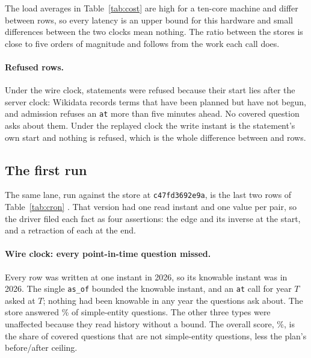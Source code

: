 The load averages in Table~\ref{tab:cost} are high for a ten-core machine and
differ between rows, so every latency is an upper bound for this hardware and
small differences between the two clocks mean nothing. The ratio between the
stores is close to five orders of magnitude and follows from the work each call
does.

\paragraph{Refused rows.}
Under the wire clock,  statements were refused because
their start lies after the server clock: Wikidata records terms that have been
planned but have not begun, and admission refuses an \texttt{at} more than five
minutes ahead. No covered question asks about them. Under the replayed clock the
write instant is the statement's own start and nothing is refused, which is the
whole difference between  and
 rows.

\subsection{The first run}
\label{sec:eval-first}

The same lane, run against the store at \texttt{c47fd3692e9a}, is the last two
rows of Table~\ref{tab:cron} \meas{}. That version had one read instant and one
value per pair, so the driver filed each fact as four assertions: the edge and
its inverse at the start, and a retraction of each at the end.

\paragraph{Wire clock: every point-in-time question missed.}
Every row was written at one instant in 2026, so its knowable instant was in
2026. The single \texttt{as\_of} bounded the knowable instant, and an
\texttt{at} call for year $T$ asked at $T$; nothing had been knowable in any year
the questions ask about. The store answered \% of
simple-entity questions. The other three types were unaffected because they read
history without a bound. The overall score, \%, is the
share of covered questions that are not simple-entity questions, less the plan's
before/after ceiling.


